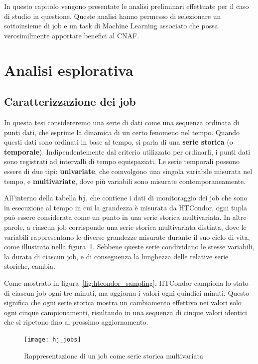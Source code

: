 \label{chap:analisi}

In questo capitolo vengono presentate le analisi preliminari effettuate per il
caso di studio in questione. Queste analisi hanno permesso di selezionare un
sottoinsieme di job e un task di Machine Learning associato che possa
verosimilmente apportare benefici al CNAF.

\section{Analisi esplorativa}

\subsection{Caratterizzazione dei job}
\label{sec:job_analysis}
In questa tesi considereremo una serie di dati come una sequenza ordinata di
punti dati, che esprime la dinamica di un certo fenomeno nel tempo. Quando
questi dati sono ordinati in base al tempo, si parla di una \textbf{serie
storica} (o \textbf{temporale}).
Indipendentemente dal criterio utilizzato per ordinarli, i punti dati sono
registrati ad intervalli di tempo equispaziati. Le serie temporali possono
essere di due tipi: \textbf{univariate}, che coinvolgono una singola variabile
misurata nel tempo, e \textbf{multivariate}, dove più variabili sono misurate
contemporaneamente.

All'interno della tabella \texttt{hj}, che contiene i dati di monitoraggio dei
job che sono in esecuzione al tempo in cui la grandezza è misurata da
HTCondor, ogni tupla può essere considerata come un punto in una serie storica
multivariata. In altre parole, a ciascun job corrisponde una serie storica
multivariata distinta, dove le variabili rappresentano le diverse grandezze
misurate durante il suo ciclo di vita, come illustrato nella
figura~\ref{fig:job_time_series}. Sebbene queste serie condividano le stesse
variabili, la durata di ciascun job, e di conseguenza la lunghezza delle
relative serie storiche, cambia.

Come mostrato in figura~\ref{fig:htcondor_sampling}, HTCondor campiona lo
stato di ciascun job ogni tre minuti, ma aggiorna i valori ogni quindici
minuti. Questo significa che ogni serie storica mostra un cambiamento
effettivo nei valori solo ogni cinque campionamenti, risultando in una
sequenza di cinque valori identici che si ripetono fino al prossimo
aggiornamento.

\begin{figure}[p]
    \centering 
    \texttt{[image: hj\_jobs]}
    \caption{\small Rappresentazione di un job come serie storica multivariata}
    \label{fig:job_time_series}
\end{figure}

